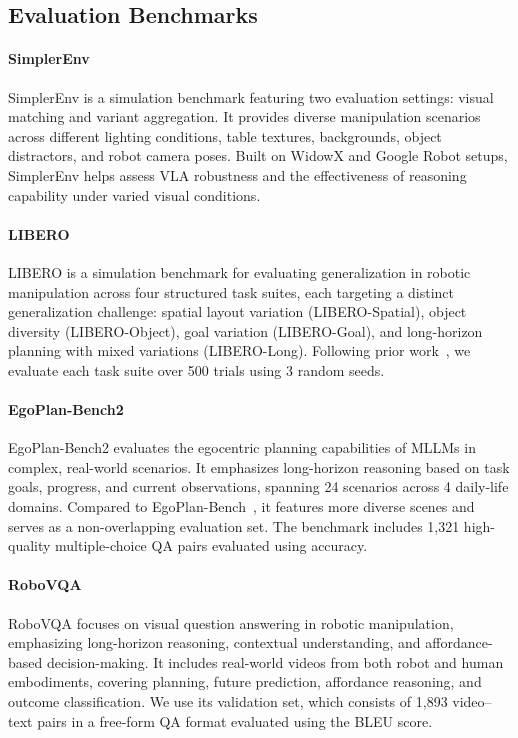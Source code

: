 \subsection{Evaluation Benchmarks}

\paragraph{SimplerEnv~\cite{li24simpler}} SimplerEnv is a simulation benchmark featuring two evaluation settings: visual matching and variant aggregation. It provides diverse manipulation scenarios across different lighting conditions, table textures, backgrounds, object distractors, and robot camera poses. Built on WidowX and Google Robot setups, SimplerEnv helps assess VLA robustness and the effectiveness of reasoning capability under varied visual conditions.

\paragraph{LIBERO~\cite{liu2023libero}} LIBERO is a simulation benchmark for evaluating generalization in robotic manipulation across four structured task suites, each targeting a distinct generalization challenge: spatial layout variation (LIBERO-Spatial), object diversity (LIBERO-Object), goal variation (LIBERO-Goal), and long-horizon planning with mixed variations (LIBERO-Long). Following prior work~\cite{zhao2025cot}, we evaluate each task suite over 500 trials using 3 random seeds.

\paragraph{EgoPlan-Bench2~\cite{qiu2024egoplan}}
EgoPlan-Bench2 evaluates the egocentric planning capabilities of MLLMs in complex, real-world scenarios. It emphasizes long-horizon reasoning based on task goals, progress, and current observations, spanning 24 scenarios across 4 daily-life domains. Compared to EgoPlan-Bench~\cite{chen2023egoplan}, it features more diverse scenes and serves as a non-overlapping evaluation set. The benchmark includes 1,321 high-quality multiple-choice QA pairs evaluated using accuracy.

\paragraph{RoboVQA~\cite{sermanet2024robovqa}}
RoboVQA focuses on visual question answering in robotic manipulation, emphasizing long-horizon reasoning, contextual understanding, and affordance-based decision-making. It includes real-world videos from both robot and human embodiments, covering planning, future prediction, affordance reasoning, and outcome classification. We use its validation set, which consists of 1,893 video–text pairs in a free-form QA format evaluated using the BLEU score.

